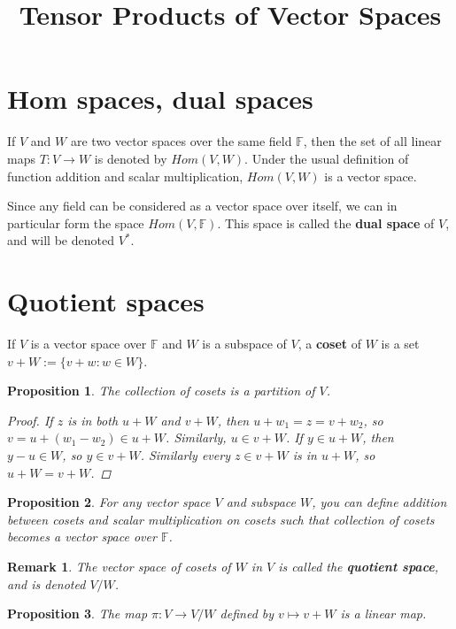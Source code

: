 \documentclass[a4paper,14pt]{article}
\title{Tensor Products of Vector Spaces}
\newtheorem*{prop}{Proposition}
\newtheorem*{remark}{Remark}
\begin{document}
\maketitle
\section{Hom spaces, dual spaces}
If $V$ and $W$ are two vector spaces over the same field $\mathbb{F}$, then the set of all linear maps $T: V \to W$ is denoted by $Hom(V, W)$. Under the usual definition of function addition and scalar multiplication, $Hom(V, W)$ is a vector space.

Since any field can be considered as a vector space over itself, we can in particular form the space $Hom(V, \mathbb{F})$. This space is called the \textbf{dual space} of $V$, and will be denoted $V^{\ast}$.

\section{Quotient spaces}
If $V$ is a vector space over $\mathbb{F}$ and $W$ is a subspace of $V$, a \textbf{coset} of $W$ is a set $v + W := \{v + w : w \in W\}$. 

\begin{prop}
The collection of cosets is a partition of $V$.
\begin{proof}
If $z$ is in both $u + W$ and $v + W$, then $u + w_1 = z = v + w_2$, so $v = u + (w_1 - w_2) \in u + W$. Similarly, $u \in v + W$. If $y \in u + W$, then $y - u \in W$, so $y \in v + W$. Similarly every $z \in v + W$ is in $u + W$, so $u + W = v + W$.
\end{proof}
\end{prop}

\begin{prop}
For any vector space $V$ and subspace $W$, you can define addition between cosets and scalar multiplication on cosets such that collection of cosets becomes a vector space over $\mathbb{F}$.
\end{prop}

\begin{remark}
The vector space of cosets of $W$ in $V$ is called the \textbf{quotient space}, and is denoted $V/W$.
\end{remark}

\begin{prop}
The map $\pi: V \to V/W$ defined by $v \mapsto v + W$ is a linear map.
\end{prop}
\end{document}
